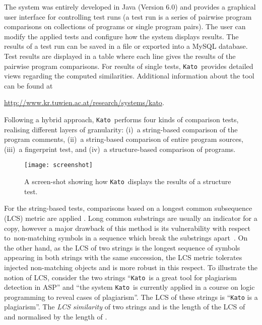 \documentclass{tlp}
\newcommand{\wrt}[0]{with respect to}
\newcommand{\kato}[0]{\texttt{Kato}\xspace}
\begin{document}
The system was entirely developed in Java (Version 6.0) and
 provides a {graphical user interface} for controlling
test runs (a test run is a  series of pairwise program comparisons on collections of programs or single program pairs).
The user can modify the applied tests and configure how the system displays results. 
The results of a test run can be saved in a file or exported into a MySQL database.
Test results  are displayed in a table where each line gives the results of  the pairwise program comparisons. For  results of single tests, \kato\ provides 
detailed views regarding the computed similarities.
Additional information about the tool 
can  be found at
\begin{center}
\url{http://www.kr.tuwien.ac.at/research/systems/kato}.
\end{center}

Following a hybrid approach, \kato\ performs four kinds
of comparison tests, 
realising different layers of granularity:
(i)~a string-based comparison of the program comments, 
(ii)~a string-based comparison of entire program sources, 
(iii)~a fingerprint test, and 
(iv)~a structure-based comparison of  programs. 

\begin{figure}[t]
\begin{center}
\texttt{[image: screenshot]}
\end{center}
\caption{A screen-shot showing how \kato\ displays the results of  a structure test. }
\label{fig:screenshot}
\end{figure}


For the string-based tests, comparisons based on a {longest common subsequence} (LCS) metric are applied \cite{bergroth00}.
Long common substrings are usually an indicator for a copy, however a major drawback of this method is its vulnerability \wrt\  non-matching  symbols in a sequence which break the substrings apart~\cite{LBPS08}.
On the other hand, as the LCS of two strings is the longest sequence of symbols appearing in both strings with the same succession, the LCS metric tolerates injected non-matching objects and is more robust in this respect.
To illustrate the notion of LCS, consider the two strings
``\kato\ is a great tool for plagiarism detection in ASP'' and
``the system \kato\ is currently applied in a course on logic programming to reveal cases of plagiarism''.
The LCS of these strings is ``\kato is a plagiarism''.
The \emph{LCS similarity} of two strings  and  is the 
 length of the LCS of  and  normalised by the length of .
\end{document}
